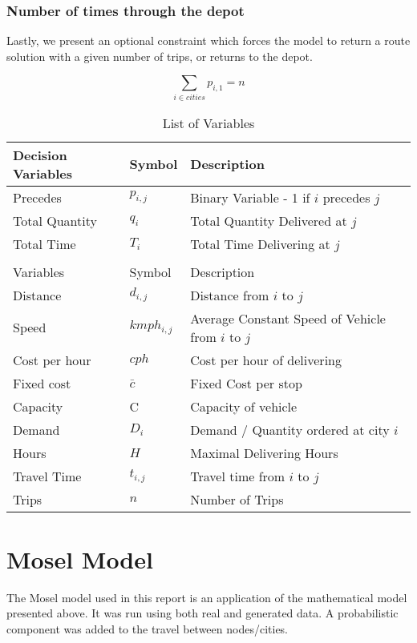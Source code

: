 \documentclass[a4paper,11pt]{article}
\begin{document}
\subsubsection{Number of times through the depot}
Lastly, we present an optional constraint which forces the model to return a route solution with a given number of trips, or returns to the depot.

\begin{equation}\label{eq13}
\sum\limits_{i \in cities} p_{i,1} = n
\end{equation}

\begin{table}[h!]
\centering
\caption{List of Variables}
\label{variables}
\begin{tabular}{lll}
\hline
Decision Variables & Symbol & Description \\
\hline
\hline
Precedes & $p_{i,j}$  & Binary Variable - 1 if $i$ precedes $j$\\
Total Quantity & $q_{i}$ & Total Quantity Delivered at $j$ \\
Total Time & $T_{i}$ & Total Time Delivering at $j$ \\ 
\\
\hline
Variables & Symbol & Description \\
\hline
\hline
Distance & $d_{i,j}$ & Distance from $i$ to $j$  \\
Speed & $kmph_{i,j}$ & Average Constant Speed of Vehicle from $i$ to $j$\\
Cost per hour & $cph$ & Cost per hour of delivering \\ 
Fixed cost & $\bar{c}$ & Fixed Cost per stop \\
Capacity & C & Capacity of vehicle \\ 
Demand & $D_{i}$ & Demand / Quantity ordered at city $i$ \\  
Hours & $H$ & Maximal Delivering Hours \\
Travel Time & $t_{i,j}$ & Travel time from $i$ to $j$ \\ 
Trips & $n$ & Number of Trips \\
\end{tabular}
\end{table}

\section{Mosel Model}

The Mosel model used in this report is an application of the mathematical model presented above. It was run using both real and generated data. A probabilistic component was added to the travel between nodes/cities.
\end{document}
